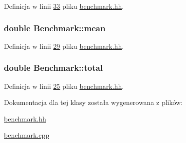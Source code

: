 Definicja w linii \hyperlink{benchmark_8hh_source_l00033}{33} pliku \hyperlink{benchmark_8hh_source}{benchmark.\-hh}.

\hypertarget{class_benchmark_aa88092b6164ad7d1243162d3012f729a}{
\subsubsection[{mean}]{\setlength{\rightskip}{0pt plus 5cm}double Benchmark\-::mean\hspace{0.3cm}{\ttfamily [private]}}}\label{class_benchmark_aa88092b6164ad7d1243162d3012f729a}


Definicja w linii \hyperlink{benchmark_8hh_source_l00029}{29} pliku \hyperlink{benchmark_8hh_source}{benchmark.\-hh}.

\hypertarget{class_benchmark_a7130c0718e3a3ab2fea70285dab122a2}{
\subsubsection[{total}]{\setlength{\rightskip}{0pt plus 5cm}double Benchmark\-::total\hspace{0.3cm}{\ttfamily [private]}}}\label{class_benchmark_a7130c0718e3a3ab2fea70285dab122a2}


Definicja w linii \hyperlink{benchmark_8hh_source_l00025}{25} pliku \hyperlink{benchmark_8hh_source}{benchmark.\-hh}.



Dokumentacja dla tej klasy została wygenerowana z plików\-:\begin{DoxyCompactItemize}
\item 
\hyperlink{benchmark_8hh}{benchmark.\-hh}\item 
\hyperlink{benchmark_8cpp}{benchmark.\-cpp}\end{DoxyCompactItemize}
